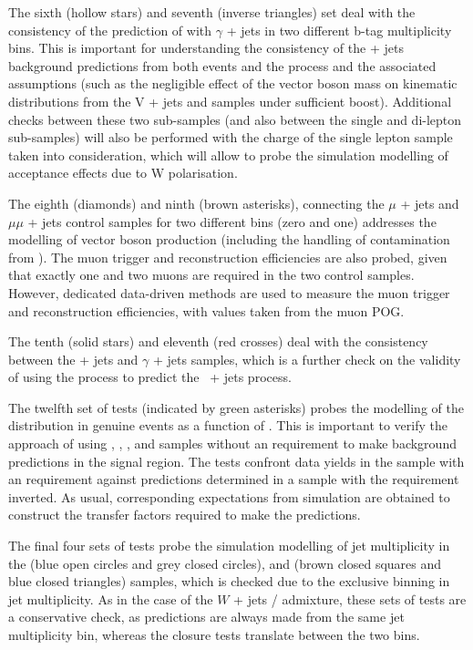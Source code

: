The sixth (hollow stars) and seventh (inverse triangles) set deal with
the consistency of the prediction of \wej with $\gamma$ + jets in two
different b-tag multiplicity bins. This is important for understanding
the consistency of the \znunu + jets background predictions from both
\wej events and the \gj process and the associated assumptions (such
as the negligible effect of the vector boson mass on kinematic
distributions from the V + jets and \gj samples under sufficient
boost). Additional checks between these two sub-samples (and also
between the single and di-lepton sub-samples) will also be performed
with the charge of the single lepton sample taken into consideration,
which will allow to probe the simulation modelling of acceptance
effects due to W polarisation.

The eighth (diamonds) and ninth (brown asterisks), connecting the $\mu$
+ jets and $\mu\mu$ + jets control samples for two different \nb bins
(zero and one) addresses the modelling of vector boson production
(including the handling of contamination from \ttbar). The muon
trigger and reconstruction efficiencies are also probed, given that
exactly one and two muons are required in the two control
samples. However, dedicated data-driven methods are used to measure
the muon trigger and reconstruction efficiencies, with values taken
from the muon POG.

The tenth (solid stars) and eleventh (red crosses) deal with the
consistency between the \zee + jets and $\gamma$ + jets
samples, which is a further check on the validity of using the \gj
process to predict the \znunu\, + jets process.

The twelfth set of tests (indicated by green asterisks) probes the
modelling of the \alphat distribution in genuine \met events as a
function of \scalht. This is important to verify the approach of using
\mj, \ej, \mmj, and \eej samples without an \alphat requirement to
make background predictions in the signal region. The tests confront
data yields in the \mj sample with an \alphat requirement against
predictions determined in a \mj sample with the \alphat requirement
inverted. As usual, corresponding expectations from simulation are
obtained to construct the transfer factors required to make the
predictions.

The final four sets of tests probe the simulation modelling of jet
multiplicity in the \ej (blue open circles and grey closed circles),
and \eej (brown closed squares and blue closed triangles) samples,
which is checked due to the exclusive binning in jet multiplicity.  As
in the case of the $W$ + jets / \ttbar admixture, these sets of tests
are a conservative check, as predictions are always made from the same
jet multiplicity bin, whereas the closure tests translate between the
two bins.


